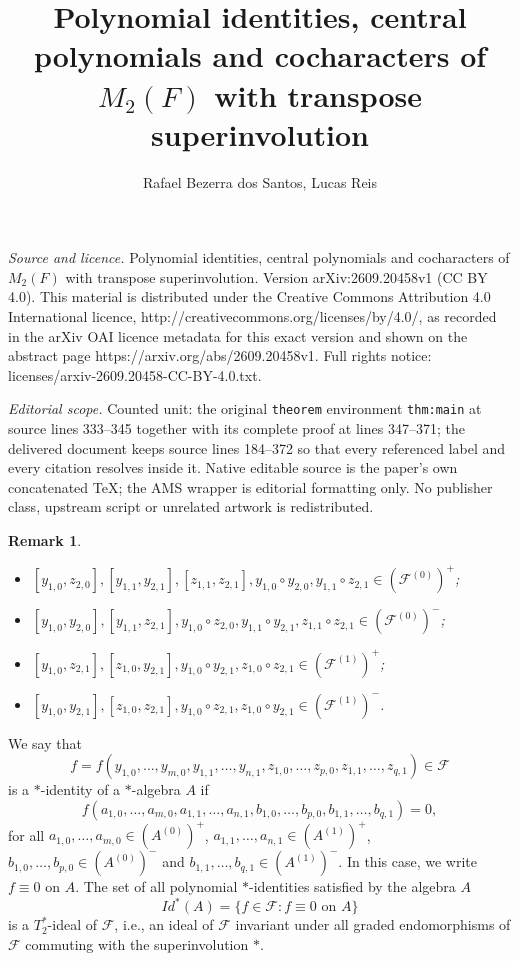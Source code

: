 \documentclass[10pt,a4paper]{amsart}
\newtheorem{remark}[theorem]{Remark}
\begin{document}
\title[Polynomial identities, central polynomials and cocharacters ]{Polynomial identities, central polynomials and cocharacters of $M_2(F)$ with transpose superinvolution}
\author{Rafael Bezerra dos Santos, Lucas Reis}
\date{}
\maketitle
\noindent\emph{Source and licence.} Polynomial identities, central polynomials and cocharacters of $M_2(F)$ with transpose superinvolution. Version arXiv:2609.20458v1 (CC BY 4.0). This material is distributed under the Creative Commons Attribution 4.0 International licence, http://creativecommons.org/licenses/by/4.0/, as recorded in the arXiv OAI licence metadata for this exact version and shown on the abstract page https://arxiv.org/abs/2609.20458v1. Full rights notice: licenses/arxiv-2609.20458-CC-BY-4.0.txt.\par\smallskip
\noindent\textit{Editorial scope.} Counted unit: the original \texttt{theorem} environment \texttt{thm:main} at source lines 333--345 together with its complete proof at lines 347--371; the delivered document keeps source lines 184--372 so that every referenced label and every citation resolves inside it. Native editable source is the paper's own concatenated TeX; the AMS wrapper is editorial formatting only. No publisher class, upstream script or unrelated artwork is redistributed.
	\begin{remark}\label{consequences}
		\
		
		\begin{itemize}
			\item[1.] $[y_{1,0},z_{2,0}], [y_{1,1},y_{2,1}],[z_{1,1},z_{2,1}],y_{1,0}\circ y_{2,0},y_{1,1}\circ z_{2,1}\in (\mathcal{F}^{(0)})^+$;
			\item[2.] $[y_{1,0},y_{2,0}], [y_{1,1},z_{2,1}], y_{1,0}\circ z_{2,0}, y_{1,1}\circ y_{2,1},z_{1,1}\circ z_{2,1}\in (\mathcal{F}^{(0)})^-$;
			\item[3.] $[y_{1,0},z_{2,1}], [z_{1,0},y_{2,1}],y_{1,0}\circ y_{2,1}, z_{1,0}\circ z_{2,1}\in (\mathcal{F}^{(1)})^+$;
			\item[4.] $[y_{1,0},y_{2,1}], [z_{1,0},z_{2,1}],y_{1,0}\circ z_{2,1}, z_{1,0}\circ y_{2,1}\in (\mathcal{F}^{(1)})^-$.
		\end{itemize}
	\end{remark}
	
	We say that $$f = f(y_{1,0},  \ldots , y_{m,0}, y_{1,1},  \ldots, y_{n,1}, z_{1,0}, \ldots, z_{p,0}, z_{1,1},  \ldots, z_{q,1}) \in \mathcal{F}$$
	is a $*$-identity of a $*$-algebra $A$ if $$f(a_{1,0}, \ldots, a_{m,0},a_{1,1}, \ldots , a_{n,1}, b_{1,0}, \ldots , b_{p,0}, b_{1,1}, \ldots , b_{q,1}) = 0,$$ 
	for all $a_{1,0}, \ldots, a_{m,0} \in (A^{(0)})^{+}$, $a_{1,1}, \ldots, a_{n,1} \in (A^{(1)})^{+}$, $b_{1,0}, \ldots, b_{p,0} \in (A^{(0)})^{-}$ and $b_{1,1}, \ldots , b_{q,1} \in (A^{(1)})^{-}$. In this case, we write $f\equiv 0$ on $A$. The set of all polynomial $*$-identities satisfied by the algebra $A$ 
	$$
	Id^*(A) = \{f \in \mathcal{F}: f \equiv 0 \mbox{ on } A \}
	$$ 
	is a $T^{*}_{2}$-ideal of $\mathcal{F}$, i.e., an ideal of $\mathcal{F}$ invariant under all graded endomorphisms of $\mathcal{F}$ commuting with the superinvolution $*$.
	
\end{document}
